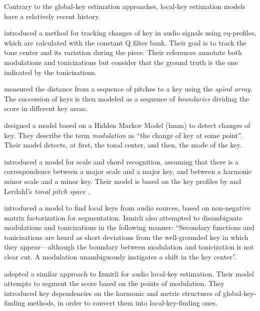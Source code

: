 


Contrary to the global-key estimation approaches, local-key
estimation models have a relatively recent history.

\textcite{purwins2000new} introduced a method for tracking
changes of key in audio signals using cq-profiles, which are
calculated with the constant Q filter bank. Their goal is to
track the tone center and its variation during the piece.
Their references annotate both modulations and tonicizations
but consider that the ground truth is the one indicated by
the tonicizations.

\textcite{chew2002spiral} measured the distance from a
sequence of pitches to a key using the \emph{spiral array}.
The succession of keys is then modeled as a sequence of
\emph{boundaries} dividing the score in different key areas.

\textcite{chai2005detection} designed a model based on a
Hidden Markov Model (\gls{hmm}) to detect changes of key. They
describe the term \emph{modulation} as ``the change of key
at some point''. Their model detects, at first, the tonal
center, and then, the mode of the key.

\textcite{catteau2007probabilistic} introduced a model for
scale and chord recognition, assuming that there is a
correspondence between a major scale and a major key, and
between a harmonic minor scale and a minor key. Their model
is based on the key profiles by
\textcite{temperley1999whats} and Lerdahl's \emph{tonal
pitch space} \parencite{lerdahl2005tonal}.

\textcite{izmirli2007localized} introduced a model to find
local keys from audio sources, based on non-negative matrix
factorization for segmentation. Izmirli also attempted to
disambiguate modulations and tonicizations in the following
manner: ``Secondary functions and tonicizations are heard as
short deviations from the well-grounded key in which they
appear---although the boundary between modulation and
tonicization is not clear cut. A modulation unambiguously
instigates a shift in the key center''.

\textcite{papadopoulos2009local} adopted a similar approach
to Izmirli for audio local-key estimation. Their model
attempts to segment the score based on the points of
modulation. They introduced key dependencies on the harmonic
and metric structures of global-key-finding methods, in
order to convert them into local-key-finding ones.

